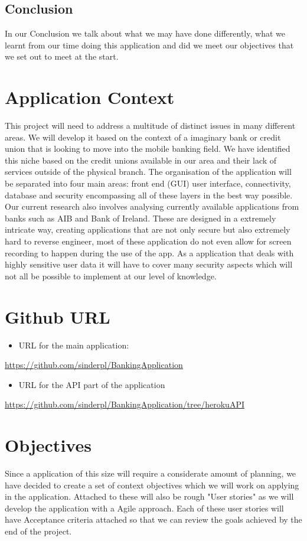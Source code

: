 \subsection{Conclusion}
In our Conclusion we talk about what we may have done differently, what we learnt from our time doing this application and did we meet our objectives that we set out to meet at the start.

\section{Application Context}
    This project will need to address a multitude of distinct issues in many different areas. We will develop it based on the context of a imaginary bank or credit union that is looking to move into the mobile banking field. We have identified this niche based on the credit unions available in our area and their lack of services outside of the physical branch.
    The organisation of the application will be separated into four main areas: front end (GUI) user interface, connectivity, database and security encompassing all of these layers in the best way possible.
    Our current research also involves analysing currently available applications from banks such as AIB and Bank of Ireland. These are designed in a extremely intricate way, creating applications that are not only secure but also extremely hard to reverse engineer, most of these application do not even allow for screen recording to happen during the use of the app.
    As a application that deals with highly sensitive user data it will have to cover many security aspects which will not all be possible to implement at our level of knowledge.


\section{Github URL}
    \begin{itemize}
    \item URL for the main application:
    \end{itemize}
    \url{https://github.com/sinderpl/BankingApplication}
    \begin{itemize}
    \item URL for the API part of the application
    \end{itemize}
    \url{https://github.com/sinderpl/BankingApplication/tree/herokuAPI}




\section{Objectives}
    Since a application of this size will require a considerate amount of planning, we have decided to create a set of context objectives which we will work on applying in the application. Attached to these will also be rough "User stories" as we will develop the application with a Agile approach.\cite{userStories} Each of these user stories will have Acceptance criteria attached so that we can review the goals achieved by the end of the project.
